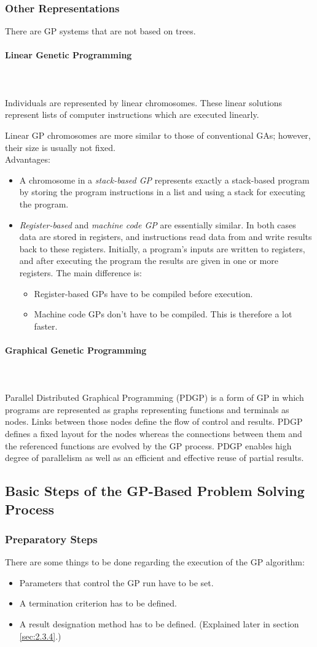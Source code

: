 \documentclass[12pt]{article}
\newcommand{\myparagraph}[1]{\paragraph{#1}\mbox{}\\\\}
\begin{document}
\subsubsection{Other Representations}
There are GP systems that are not based on trees.
\myparagraph{Linear Genetic Programming}
Individuals are represented by linear chromosomes. These linear solutions represent lists of computer instructions which are executed linearly.

Linear GP chromosomes are more similar to those of conventional GAs; however, their size is usually not fixed.\\
Advantages:
\begin{itemize}
\item A chromosome in a \textit{stack-based GP} represents exactly a stack-based program by storing the program instructions in a list and using a stack for executing the program.
\item \textit{Register-based} and \textit{machine code GP} are essentially similar. In both cases data are stored in registers, and instructions read data from and write results back to these registers. Initially, a program's inputs are written to registers, and after executing the program the results are given in one or more registers. The main difference is:
\begin{itemize}
\item Register-based GPs have to be compiled before execution.
\item Machine code GPs don't have to be compiled. This is therefore a lot faster.
\end{itemize}
\end{itemize}
\myparagraph{Graphical Genetic Programming}
Parallel Distributed Graphical Programming (PDGP) is a form of GP in which programs are represented as graphs representing functions and terminals as nodes. Links between those nodes define the flow of control and results. PDGP defines a fixed layout for the nodes whereas the connections between them and the referenced functions are evolved by the GP process. PDGP enables high degree of parallelism as well as an efficient and effective reuse of partial results.
\subsection{Basic Steps of the GP-Based Problem Solving Process}
\subsubsection{Preparatory Steps}
There are some things to be done regarding the execution of the GP algorithm:
\begin{itemize}
\item Parameters that control the GP run have to be set.
\item A termination criterion has to be defined.
\item A result designation method has to be defined. (Explained later in section \ref{sec:2.3.4}.)
\end{itemize}
\end{document}
